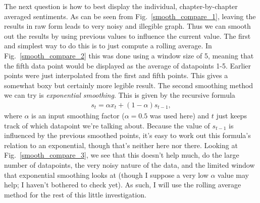 \documentclass[11pt]{article}
\begin{document}
\noindent
The next question is how to best display the individual, chapter-by-chapter averaged sentiments. As can be seen from Fig.~\ref{smooth_compare_1}, leaving the results in raw form leads to very noisy and illegible graph. Thus we can smooth out the results by using previous values to influence the current value. The first and simplest way to do this is to just compute a rolling average. In Fig.~\ref{smooth_compare_2} this was done using a window size of 5, meaning that the fifth data point would be displayed as the average of datapoints 1-5. Earlier points were just interpolated from the first and fifth points. This gives a somewhat boxy but certainly more legible result. The second smoothing method we can try is \emph{exponential smoothing}. This is given by the recursive formula
\begin{align*}
s_t = \alpha x_t + (1-\alpha)s_{t-1},
\end{align*}
where $\alpha$ is an input smoothing factor ($\alpha=0.5$ was used here) and $t$ just keeps track of which datapoint we're talking about. Because the value of $s_{t-1}$ is influenced by the previous smoothed points, it's easy to work out this formula's relation to an exponential, though that's neither here nor there. Looking at Fig.~\ref{smooth_compare_3}, we see that this doesn't help much, do the large number of datapoints, the very noisy nature of the data, and the limited window that exponential smoothing looks at (though I suppose a very low $\alpha$ value may help; I haven't bothered to check yet). As such, I will use the rolling average method for the rest of this little investigation.  
\end{document}
